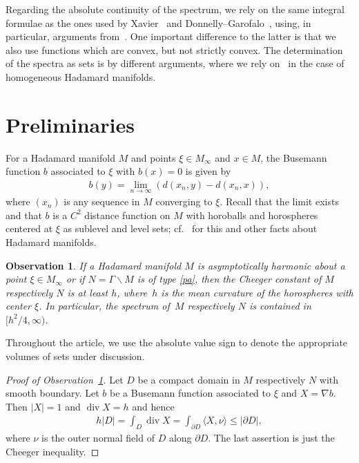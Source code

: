 \documentclass[10pt,a4paper]{amsart}
\numberwithin{equation}{section}
\newtheorem{obs}[Theorem]{Observation}
 { \theoremstyle{definition}
\newtheorem{Definition}[Theorem]{Definition}
\newtheorem{Note}[Theorem]{Note}
\newtheorem{Example}[Theorem]{Example}
\newtheorem{Remark}[Theorem]{Remark}
\newtheorem{exas}[Theorem]{Examples}
\newtheorem{exa}[Theorem]{Example}}
\DeclareMathOperator{\diver}{div}
\begin{document}
Regarding the absolute continuity of the spectrum,
we rely on the same integral formulae as the ones used by Xavier~\cite{Xavier1988} and Donnelly--Garofalo~\cite{DoGa92,DoGa97},
using, in particular, arguments from~\cite{Xavier1988}.
One important difference to the latter is that we also use functions which are convex,
but not strictly convex.
The determination of the spectra as sets is by different arguments,
where we rely on~\cite{P21} in the case of homogeneous Hadamard manifolds.

\section{Preliminaries}

For a Hadamard manifold $M$ and points $\xi\in M_\infty$ and $x\in M$,
the Busemann function $b$ associated to $\xi$ with $b(x)=0$ is given by
\begin{align*}
	b(y) = \lim_{n\to\infty} (d(x_n,y)-d(x_n,x)),
\end{align*}
where $(x_n)$ is any sequence in $M$ converging to $\xi$.
Recall that the limit exists and that $b$ is a $C^2$ distance function on $M$
with horoballs and horospheres centered at $\xi$ as sublevel and level sets;
cf.~\cite{Ba95} for this and other facts about Hadamard manifolds.

\begin{obs}\label{chee}
If a Hadamard manifold $M$ is asymptotically harmonic about a point $\xi\in M_\infty$
or if $N=\Gamma\backslash M$ is of type {\rm \ref{pa}},
then the Cheeger constant of $M$ respectively $N$ is at least $h$,
where~$h$ is the mean curvature of the horospheres with center $\xi$.
In particular, the spectrum of~$M$ respectively $N$ is contained in $\bigl[h^2/4,\infty\bigr)$.
\end{obs}

Throughout the article,
we use the absolute value sign to denote the appropriate volumes of sets under discussion.

\begin{proof}[Proof of Observation~\ref{chee}]
Let $D$ be a compact domain in $M$ respectively $N$ with smooth boundary.
Let $b$ be a Busemann function associated to $\xi$ and $X=\nabla b$.
Then $|X|=1$ and $\diver X=h$ and hence
\begin{align*}
	h|D| = \int_D\diver X = \int_{\partial D}\langle X,\nu\rangle \le |\partial D|,
\end{align*}
where $\nu$ is the outer normal field of $D$ along $\partial D$.
The last assertion is just the Cheeger in\-equality.
\end{proof}
\end{document}
